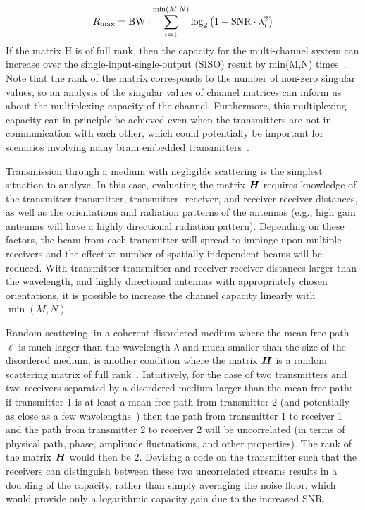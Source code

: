 \[R_{\text{\scriptsize max}} = \text{BW} \cdot \sum_{i=1}^{\min(M,N)} \log_2\left(1+\text{SNR} \cdot \lambda_i^2\right)\]
If the matrix H is of full rank, then the capacity for the multi-channel system can increase over the single-input-single-output (SISO) result by min(M,N) times~\cite{shiu00}.
Note that the rank of the matrix corresponds to the number of non-zero singular values, so an analysis of the singular values of channel matrices can inform us about the multiplexing capacity of the channel.
Furthermore, this multiplexing capacity can in principle be achieved even when the transmitters are not in communication with each other, which could potentially be important for scenarios involving many brain embedded transmitters~\cite{spencer04}.

Transmission through a medium with negligible scattering is the simplest situation to analyze.
In this case, evaluating the matrix $\mat{H}$ requires knowledge of the transmitter-transmitter, transmitter- receiver, and receiver-receiver distances, as well as the orientations and radiation patterns of the antennas (e.g., high gain antennas will have a highly directional radiation pattern).
Depending on these factors, the beam from each transmitter will spread to impinge upon multiple receivers and the effective number of spatially independent beams will be reduced.
With transmitter-transmitter and receiver-receiver distances larger than the wavelength, and highly directional antennas with appropriately chosen orientations, it is possible to increase the channel capacity linearly with $\min(M,N)$.

Random scattering, in a coherent disordered medium where the mean free-path $\ell$ is much larger than the wavelength $\lambda$ and much smaller than the size of the disordered medium, is another condition where the matrix $\mat{H}$ is a random scattering matrix of full rank~\cite{moustakas00,popoff10}.
Intuitively, for the case of two transmitters and two receivers separated by a disordered medium larger than the mean free path:
if transmitter 1 is at least a mean-free path from transmitter 2 (and potentially as close as a few wavelengths~\cite{berkovits91}) then the path from transmitter 1 to receiver 1 and the path from transmitter 2 to receiver 2 will be uncorrelated (in terms of physical path, phase, amplitude fluctuations, and other properties).
The rank of the matrix $\mat{H}$ would then be 2.
Devising a code on the transmitter such that the receivers can distinguish between these two uncorrelated streams results in a doubling of the capacity, rather than simply averaging the noise floor, which would provide only a logarithmic capacity gain due to the increased SNR.

